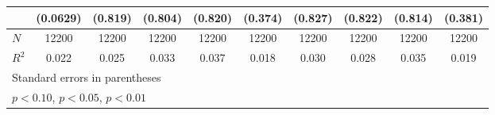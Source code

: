 \begin{table}[htbp]
\begin{tabular}{l*{9}{c}}
            &    (0.0629)         &     (0.819)         &     (0.804)         &     (0.820)         &     (0.374)         &     (0.827)         &     (0.822)         &     (0.814)         &     (0.381)         \\
\hline
\(N\)       &       12200         &       12200         &       12200         &       12200         &       12200         &       12200         &       12200         &       12200         &       12200         \\
\(R^{2}\)   &       0.022         &       0.025         &       0.033         &       0.037         &       0.018         &       0.030         &       0.028         &       0.035         &       0.019         \\
\hline\hline
\multicolumn{10}{l}{\footnotesize Standard errors in parentheses}\\
\multicolumn{10}{l}{\footnotesize \sym{*} \(p<0.10\), \sym{**} \(p<0.05\), \sym{***} \(p<0.01\)}\\
\end{tabular}
\end{table}
